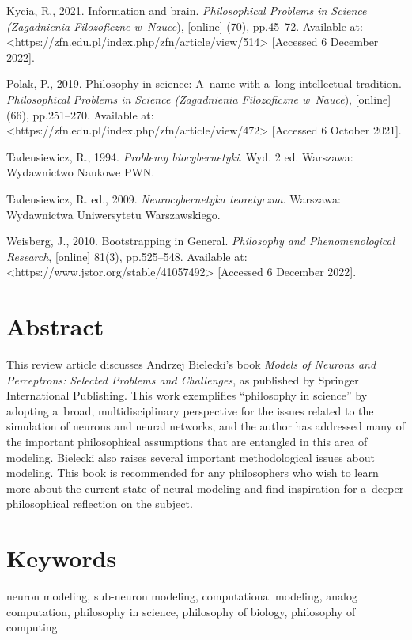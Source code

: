 Kycia, R., 2021. Information and brain. \textit{Philosophical Problems in Science (Zagadnienia Filozoficzne w~Nauce}), [online] (70), pp.45–72. Available at: {\textless}https://zfn.edu.pl/index.php/zfn/article/view/514{\textgreater} [Accessed 6 December 2022].

Polak, P., 2019. Philosophy in science: A~name with a~long intellectual tradition. \textit{Philosophical Problems in Science (Zagadnienia Filozoficzne w~Nauce}), [online] (66), pp.251–270. Available at: {\textless}https://zfn.edu.pl/index.php/zfn/article/view/472{\textgreater} [Accessed 6 October 2021].

Tadeusiewicz, R., 1994. \textit{Problemy biocybernetyki}. Wyd. 2 ed. Warszawa: Wydawnictwo Naukowe PWN.

Tadeusiewicz, R. ed., 2009. \textit{Neurocybernetyka teoretyczna}. Warszawa: Wydawnictwa Uniwersytetu Warszawskiego.

Weisberg, J., 2010. Bootstrapping in General. \textit{Philosophy and Phenomenological Research}, [online] 81(3), pp.525–548. Available at: {\textless}https://www.jstor.org/stable/41057492{\textgreater} [Accessed 6 December 2022].

\section{Abstract}
This review article discusses Andrzej Bielecki's book \textit{Models of Neurons and Perceptrons: Selected Problems and Challenges}, as published by Springer International Publishing. This work exemplifies ``philosophy in science'' by adopting a~broad, multidisciplinary perspective for the issues related to the simulation of neurons and neural networks, and the author has addressed many of the important philosophical assumptions that are entangled in this area of modeling. Bielecki also raises several important methodological issues about modeling. This book is recommended for any philosophers who wish to learn more about the current state of neural modeling and find inspiration for a~deeper philosophical reflection on the subject.

\section{Keywords}
neuron modeling, sub-neuron modeling, computational modeling, analog computation, philosophy in science, philosophy of biology, philosophy of computing




